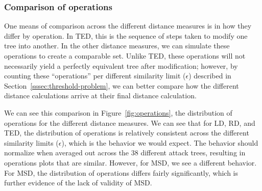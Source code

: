 \subsubsection{Comparison of operations}

One means of comparison across the different distance measures is in how they differ by operation. In TED, this is the sequence of steps taken to modify one tree into another. In the other distance measures, we can simulate these operations to create a comparable set. Unlike TED, these operations will not necessarily yield a perfectly equivalent tree after modification; however, by counting these ``operations'' per different similarity limit ($\epsilon$) described in Section~\ref{sssec:threshold-problem}, we can better compare how the different distance calculations arrive at their final distance calculation.

We can see this comparison in Figure~\ref{fig:operations}, the distribution of operations for the different distance measures. We can see that for LD, RD, and TED, the distribution of operations is relatively consistent across the different similarity limits ($\epsilon$), which is the behavior we would expect. The behavior should normalize when averaged out across the 38 different attack trees, resulting in operations plots that are similar. However, for MSD, we see a different behavior. For MSD, the distribution of operations differs fairly significantly, which is further evidence of the lack of validity of MSD.

